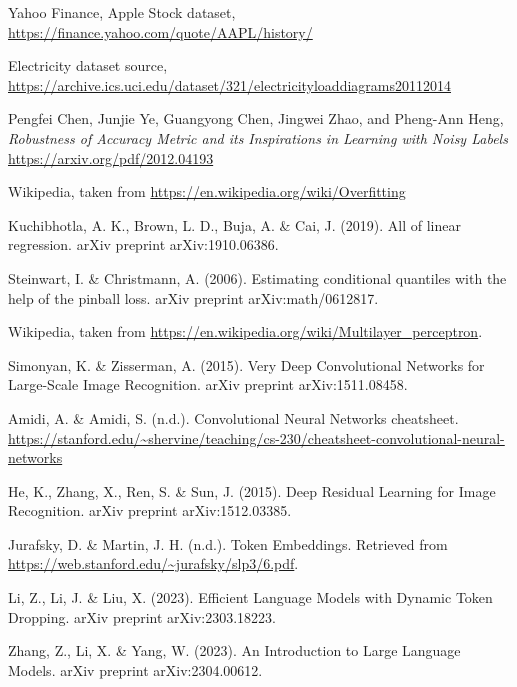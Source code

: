 
\begin{thebibliography}{99}


	 Yahoo Finance, Apple Stock dataset, \url{https://finance.yahoo.com/quote/AAPL/history/}

	 Electricity dataset source, \url{https://archive.ics.uci.edu/dataset/321/electricityloaddiagrams20112014}

	Pengfei Chen, Junjie Ye, Guangyong Chen, Jingwei Zhao, and Pheng-Ann Heng,
	\emph{Robustness of Accuracy Metric and its Inspirations in Learning with Noisy Labels} \url{https://arxiv.org/pdf/2012.04193}

	 Wikipedia, taken from \url{https://en.wikipedia.org/wiki/Overfitting}

	 Kuchibhotla, A. K., Brown, L. D., Buja, A. \& Cai, J. (2019). All of linear regression. arXiv preprint arXiv:1910.06386.

	 Steinwart, I. \& Christmann, A. (2006). Estimating conditional quantiles with the help of the pinball loss. arXiv preprint arXiv:math/0612817.

	 Wikipedia, taken from \url{https://en.wikipedia.org/wiki/Multilayer_perceptron}.

	 Simonyan, K. \& Zisserman, A. (2015). Very Deep Convolutional Networks for Large-Scale Image Recognition. arXiv preprint arXiv:1511.08458.

	 Amidi, A. \& Amidi, S. (n.d.). Convolutional Neural Networks cheatsheet. \url{https://stanford.edu/~shervine/teaching/cs-230/cheatsheet-convolutional-neural-networks}

	 He, K., Zhang, X., Ren, S. \& Sun, J. (2015). Deep Residual Learning for Image Recognition. arXiv preprint arXiv:1512.03385.

	 Jurafsky, D. \& Martin, J. H. (n.d.). Token Embeddings. Retrieved from \url{https://web.stanford.edu/~jurafsky/slp3/6.pdf}.

	 Li, Z., Li, J. \& Liu, X. (2023). Efficient Language Models with Dynamic Token Dropping. arXiv preprint arXiv:2303.18223.

	 Zhang, Z., Li, X. \& Yang, W. (2023). An Introduction to Large Language Models. arXiv preprint arXiv:2304.00612.


\end{thebibliography}
